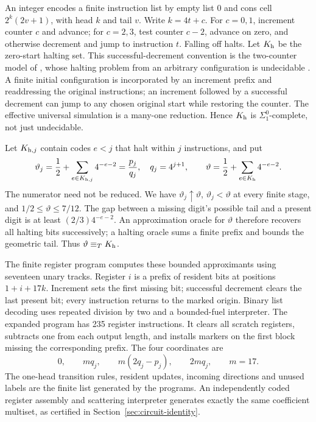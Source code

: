 An integer encodes a finite instruction list by empty list \(0\) and cons cell \(2^k(2v+1)\), with head \(k\) and tail \(v\). Write \(k=4t+c\). For \(c=0,1\), increment counter \(c\) and advance; for \(c=2,3\), test counter \(c-2\), advance on zero, and otherwise decrement and jump to instruction \(t\). Falling off halts. Let \(K_{\rm h}\) be the zero-start halting set. This successful-decrement convention is the two-counter model of \cite[Definition~2]{dudenhefner}, whose halting problem from an arbitrary configuration is undecidable \cite[Theorem~6, after Minsky]{dudenhefner}. A finite initial configuration is incorporated by an increment prefix and readdressing the original instructions; an increment followed by a successful decrement can jump to any chosen original start while restoring the counter. The effective universal simulation is a many-one reduction. Hence \(K_{\rm h}\) is \(\Sigma^0_1\)-complete, not just undecidable.

Let \(K_{{\rm h},j}\) contain codes \(e<j\) that halt within \(j\) instructions, and put
\begin{equation}\label{eq:theta-binary}
 \vartheta_j=\frac12+\sum_{e\in K_{{\rm h},j}}4^{-e-2}
 =\frac{p_j}{q_j},\quad q_j=4^{j+1},\qquad
 \vartheta=\frac12+\sum_{e\in K_{\rm h}}4^{-e-2}.
\end{equation}
The numerator need not be reduced. We have \(\vartheta_j\uparrow\vartheta\), \(\vartheta_j<\vartheta\) at every finite stage, and \(1/2\le\vartheta\le7/12\). The gap between a missing digit's possible tail and a present digit is at least \((2/3)4^{-e-2}\). An approximation oracle for \(\vartheta\) therefore recovers all halting bits successively; a halting oracle sums a finite prefix and bounds the geometric tail. Thus \(\vartheta\equiv_T K_{\rm h}\).

The finite register program computes these bounded approximants using seventeen unary tracks. Register \(i\) is a prefix of resident bits at positions \(1+i+17k\). Increment sets the first missing bit; successful decrement clears the last present bit; every instruction returns to the marked origin. Binary list decoding uses repeated division by two and a bounded-fuel interpreter. The expanded program has 235 register instructions. It clears all scratch registers, subtracts one from each output length, and installs markers on the first block missing the corresponding prefix. The four coordinates are
\[
 0,\qquad mq_j,\qquad m(2q_j-p_j),\qquad 2mq_j,
 \qquad m=17.
\]
The one-head transition rules, resident updates, incoming directions and unused labels are the finite list generated by the programs. An independently coded register assembly and scattering interpreter generates exactly the same coefficient multiset, as certified in Section~\ref{sec:circuit-identity}.


